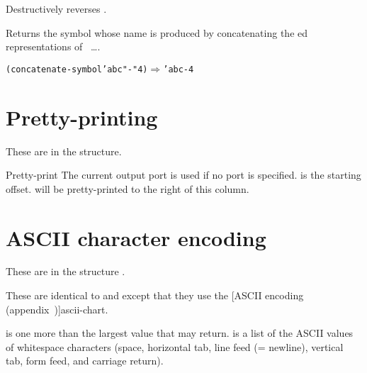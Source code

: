\begin{protos}
\end{protos}
Destructively reverses .

\begin{protos}
\end{protos}
Returns the symbol whose name is produced by concatenating the
ed
representations of ~\ldots.
%
\begin{alltt}
(concatenate-symbol 'abc "-" 4) \(\Longrightarrow\) 'abc-4
\end{alltt}

\section{Pretty-printing}

These are in the  structure.

\begin{protos}
\end{protos}
Pretty-print  The current output port is used if no port is
specified.   is the starting offset.   will be
pretty-printed to the right of this column.

\section{ASCII character encoding}
\label{ascii-procedures}

These are in the structure .

\begin{protos}
\end{protos}
\noindent
These are identical to  and  except that
 they use the
[ASCII encoding (appendix~\Ref)]{ascii-chart}.

\begin{protos}
\end{protos}
 is one more than the largest value that 
 may return.
 is a list of the ASCII values of whitespace characters
 (space, horizontal tab, line feed (= newline), vertical tab, form feed, and
 carriage return).


